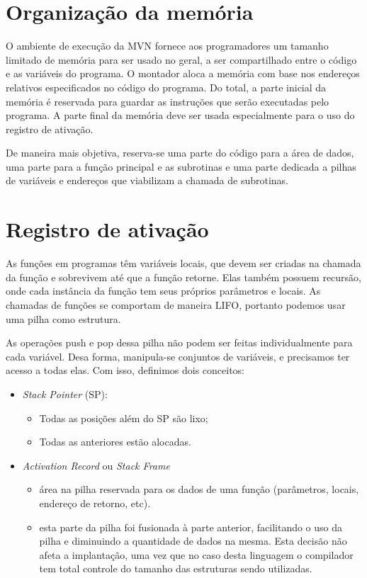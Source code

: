 
\section{Organização da memória}

O ambiente de execução da MVN fornece aos programadores um tamanho limitado de memória para ser usado no geral, a ser compartilhado entre o código e as variáveis do programa. O montador aloca a memória com base nos endereços relativos especificados no código do programa. Do total, a parte inicial da memória é reservada para guardar as instruções que serão executadas pelo programa. A parte final da memória deve ser usada especialmente para o uso do registro de ativação.

De maneira mais objetiva, reserva-se uma parte do código para a área de dados, uma parte para a função principal e as subrotinas e uma parte dedicada a pilhas de variáveis e endereços que viabilizam a chamada de subrotinas.

\section{Registro de ativação}

As funções em programas têm variáveis locais, que devem ser criadas na chamada da função e sobrevivem até que a função retorne. Elas também possuem recursão, onde cada instância da função tem seus próprios parâmetros e locais. As chamadas de funções se comportam de maneira LIFO, portanto podemos usar uma pilha como estrutura.

As operações push e pop dessa pilha não podem ser feitas individualmente para cada variável. Desa forma, manipula-se conjuntos de variáveis, e precisamos ter acesso a todas elas. Com isso, definimos dois conceitos:

\begin{itemize}
	\item \emph{Stack Pointer} (SP):
	\begin{itemize}
		\item Todas as posições além do SP são lixo;
		\item Todas as anteriores estão alocadas.
	\end{itemize}
	
	\item \emph{Activation Record} ou \emph{Stack Frame}
	\begin{itemize}
		\item área na pilha reservada para os dados de uma função (parâmetros, locais, endereço de retorno, etc).
                \item esta parte da pilha foi fusionada à parte anterior,
                    facilitando o uso da pilha e diminuindo a quantidade de
                    dados na mesma. Esta decisão não afeta a implantação, uma
                    vez que no caso desta linguagem o compilador tem total
                    controle do tamanho das estruturas sendo utilizadas. 
	\end{itemize}
\end{itemize}


